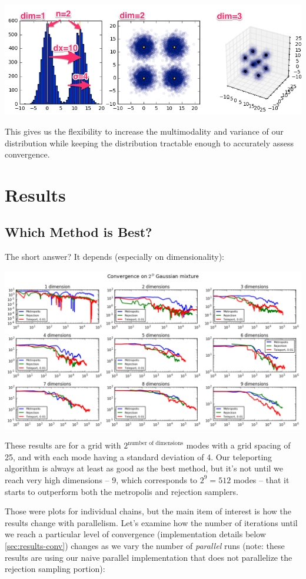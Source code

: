 \documentclass{article}
\begin{document}
\includegraphics[width=\textwidth]{gmixgrid.png}

This gives us the flexibility to increase the multimodality and variance of our
distribution while keeping the distribution tractable enough to accurately
assess convergence.

\section{Results}

\subsection{Which Method is Best?}

The short answer? It depends (especially on dimensionality):

\includegraphics[width=\textwidth]{which-meth-best.png}

These results are for a grid with $2^\text{number of dimensions}$ modes
with a grid spacing of 25, and with each mode having a standard deviation of 4.
Our teleporting algorithm is always at least as good as the best method, but
it's not until we reach very high dimensions -- 9, which corresponds to
$2^9=512$ modes -- that it starts to outperform both the metropolis and
rejection samplers.

Those were plots for individual chains, but the main item of interest is how
the results change with parallelism. Let's examine how the number of iterations
until we reach a particular level of convergence (implementation details
below \ref{sec:results-conv}) changes as we vary the number of \textit{parallel} runs (note:
these results are using our naive parallel implementation that does not
parallelize the rejection sampling portion):
\end{document}
